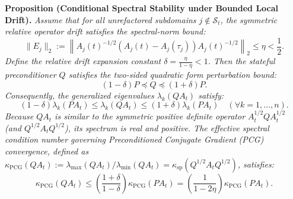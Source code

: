 \documentclass[preprint,12pt,3p]{elsarticle}
\begin{document}
\noindent\textbf{Proposition (Conditional Spectral Stability under Bounded Local Drift).}
\textit{Assume that for all unrefactored subdomains $j \notin \mathcal{S}_t$, the symmetric relative operator drift satisfies the spectral-norm bound:
\begin{equation}
\|E_j\|_2 := \left\| A_j(t)^{-1/2} \left( A_j(t) - A_j(\tau_j) \right) A_j(t)^{-1/2} \right\|_2 \le \eta < \frac{1}{2}.
\label{eq:prop_condition}
\end{equation}
Define the relative drift expansion constant $\delta = \frac{\eta}{1 - \eta} < 1$. Then the stateful preconditioner $Q$ satisfies the two-sided quadratic form perturbation bound:
\begin{equation}
(1 - \delta) P \preceq Q \preceq (1 + \delta) P.
\label{eq:quadratic_bound}
\end{equation}
Consequently, the generalized eigenvalues $\lambda_k(Q A_t)$ satisfy:
\begin{equation}
(1 - \delta) \lambda_k(P A_t) \le \lambda_k(Q A_t) \le (1 + \delta) \lambda_k(P A_t) \quad (\forall k=1, \dots, n).
\end{equation}
Because $Q A_t$ is similar to the symmetric positive definite operator $A_t^{1/2} Q A_t^{1/2}$ (and $Q^{1/2} A_t Q^{1/2}$), its spectrum is real and positive. The effective spectral condition number governing Preconditioned Conjugate Gradient (PCG) convergence, defined as $\kappa_{\text{PCG}}(Q A_t) := \lambda_{\max}(Q A_t) / \lambda_{\min}(Q A_t) = \kappa_{\text{sp}}(Q^{1/2} A_t Q^{1/2})$, satisfies:
\begin{equation}
\kappa_{\text{PCG}}(Q A_t) \le \left( \frac{1 + \delta}{1 - \delta} \right) \kappa_{\text{PCG}}(P A_t) = \left( \frac{1}{1 - 2\eta} \right) \kappa_{\text{PCG}}(P A_t).
\label{eq:condition_number_bound}
\end{equation}}
\end{document}
